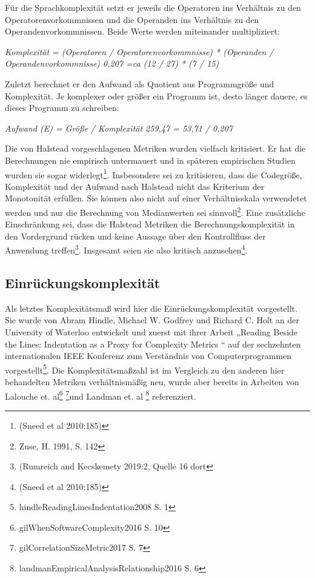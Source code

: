 Für die Sprachkomplexität setzt er jeweils die Operatoren ins Verhältnis
zu den Operatorenvorkommnissen und die Operanden ins Verhältnis zu den
Operandenvorkommnissen. Beide Werte werden miteinander multipliziert:

\emph{Komplexität = (Operatoren / Operatorenvorkommnisse) * (Operanden /
Operandenvorkommnisse) 0,207 =ca (12 / 27) * (7 / 15)}

Zuletzt berechnet er den Aufwand als Quotient aus Programmgröße und
Komplexität. Je komplexer oder größer ein Programm ist, desto länger
dauere, es dieses Programm zu schreiben:

\emph{Aufwand (E) = Größe / Komplexität 259,47 = 53,71 / 0,207}

Die von Halstead vorgeschlagenen Metriken wurden vielfach kritisiert. Er
hat die Berechnungen nie empirisch untermauert und in späteren
empirischen Studien wurden sie sogar widerlegt\footnote{(Sneed et al
  2010:185)}. Insbesondere sei zu kritisieren, dass die Codegröße,
Komplexität und der Aufwand nach Halstead nicht das Kriterium der
Monotonität erfüllen. Sie können also nicht auf einer Verhältnisskala
verwendetet werden und nur die Berechnung von Medianwerten sei
sinnvoll\footnote{Zuse, H. 1991, S. 142}. Eine zusätzliche Einschränkung
sei, dass die Halstead Metriken die Berechnungskomplexität in den
Vordergrund rücken und keine Aussage über den Kontrollfluss der
Anwendung treffen\footnote{(Rumreich and Kecskemety 2019:2, Quelle 16
  dort}. Insgesamt seien sie also kritisch anzusehen\footnote{(Sneed et
  al 2010:185)}.


\subsection{Einrückungskomplexität}\label{Einruckungskomplexitat}

Als letztes Komplexitätsmaß wird hier die Einrückungskomplexität
vorgestellt. Sie wurde von Abram Hindle, Michael W. Godfrey und Richard
C. Holt an der University of Waterloo entwickelt und zuerst mit ihrer
Arbeit „Reading Beside the Lines: Indentation as a Proxy for Complexity
Metrics `` auf der sechzehnten internationalen IEEE Konferenz zum
Verständnis von Computerprogrammen vorgestellt\footnote{hindleReadingLinesIndentation2008
  S. 1}. Die Komplexitätsmaßzahl ist im Vergleich zu den anderen hier
behandelten Metriken verhältnismäßig neu, wurde aber bereits in Arbeiten
von Lalouche et. al\footnote{gilWhenSoftwareComplexity2016 S. 10}
\footnote{gilCorrelationSizeMetric2017 S. 7}und Landman et. al
\footnote{landmanEmpiricalAnalysisRelationship2016 S. 6} referenziert.

